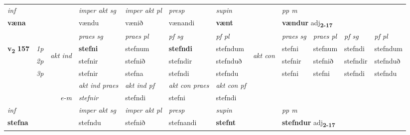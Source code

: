 \begin{longtable}[l]{X>{\footnotesize\itshape}llXXXXlXXXX}
\cmidrule{4-7}
   {\textit{inf}} & &  & \textit{imper akt sg} & \textit{imper akt pl}   & \textit{presp} & \textit{supin}  && \textit{pp m} \\*
  {\textbf{væna}} & && vændu  & vænið   & vænandi &  \textbf{vænt}  && \multicolumn{2}{l}{\textbf{vændur} adj\textbf{\textsubscript{2-17}}} \\*

\midrule

 & &   & \textit{praes sg}  & \textit{praes pl}    & \textit{ pf sg} & \textit{pf pl} & & \textit{praes sg}  & \textit{praes pl}    & \textit{pf sg} & \textit{pf pl }  \\ \cmidrule{4-7} \cmidrule{9-12}
 \multirow{2}{*}{{{\textbf{v{\textsubscript{2}}} \Large{\textbf{157}}}}}  & 1p & \multirow{3}{*}{\begin{turn}{90}\textit{akt ind}\end{turn}} & \textbf{stefni} & stefnum & \textbf{stefndi} & stefndum & \multirow{3}{*}{\begin{turn}{90}\textit{akt con}\end{turn}} &stefni & stefnum & stefndi & stefndum\\*
 & 2p &  &  stefnir  & stefnið & stefndir & stefnduð & & stefnir & stefnið & stefndir & stefnduð \\*
 & 3p &  & stefnir & stefna & stefndi & stefndu & & stefni & stefni& stefndi & stefndu \\*
\cmidrule{4-7} \cmidrule{9-12}

   && &  \textit{akt ind praes} & \textit{akt ind pf} & \textit{akt con praes} & \textit{akt con pf} \\*
\multicolumn{3}{r}{\textit{e-m}} & stefnir & stefndi & stefni & stefndi \\*

\cmidrule{4-7}
   {\textit{inf}} & &  & \textit{imper akt sg} & \textit{imper akt pl}   & \textit{presp} & \textit{supin}  && \textit{pp m} \\*
  {\textbf{stefna}} & && stefndu  & stefnið   & stefnandi &  \textbf{stefnt}  && \multicolumn{2}{l}{\textbf{stefndur} adj\textbf{\textsubscript{2-17}}} \\*

\midrule


\end{longtable}
